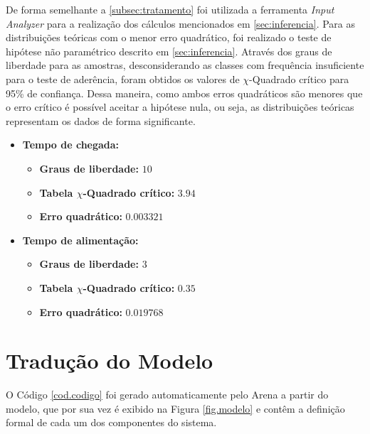 \documentclass[pt,disc,oneside]{ufscpgeasthesis}
\begin{document}
			De forma semelhante a \ref{subsec:tratamento} foi utilizada a ferramenta \textit{Input Analyzer} para a realização dos cálculos mencionados em \ref{sec:inferencia}.
			Para as distribuições teóricas com o menor erro quadrático, foi realizado o teste de hipótese não paramétrico descrito em \ref{sec:inferencia}.
			Através dos graus de liberdade para as amostras, desconsiderando as classes com frequência insuficiente para o teste de aderência, foram obtidos os valores de $\chi$-Quadrado crítico para 95\% de confiança.
			Dessa maneira, como ambos erros quadráticos são menores que o erro crítico é possível aceitar a hipótese nula, ou seja, as distribuições teóricas representam os dados de forma significante.
			
			\begin{itemize}

				\item{\textbf{Tempo de chegada:}}
				\begin{itemize}
					\item{\textbf{Graus de liberdade:}} $10$
					\item{\textbf{Tabela $\chi$-Quadrado crítico:}} $3.94$
					\item{\textbf{Erro quadrático:}} $0.003321$
				\end{itemize}

				\item{\textbf{Tempo de alimentação:}}
				\begin{itemize}
					\item{\textbf{Graus de liberdade:}} $3$
					\item{\textbf{Tabela $\chi$-Quadrado crítico:}} $0.35$
					\item{\textbf{Erro quadrático:}} $0.019768$
				\end{itemize}

			\end{itemize}

		\section{Tradução do Modelo}
		\label{sec:traducao}

			O Código \ref{cod.codigo} foi gerado automaticamente pelo Arena a partir do modelo, que por sua vez é exibido na Figura \ref{fig.modelo} e contêm a definição formal de cada um dos componentes do sistema.

			\vspace{.5 cm}			

			
			\lstset{
				tabsize=1,
				language=verilog,
				basicstyle=\scriptsize\ttfamily,
				breaklines=true,
				showstringspaces=false,
				frame=single,
				numbers=left
			}
\end{document}

